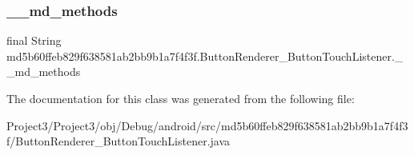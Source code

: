 \subsubsection{\texorpdfstring{\+\_\+\+\_\+md\+\_\+methods}{\_\_md\_methods}}
{\footnotesize\ttfamily final String md5b60ffeb829f638581ab2bb9b1a7f4f3f.\+Button\+Renderer\+\_\+\+Button\+Touch\+Listener.\+\_\+\+\_\+md\+\_\+methods\hspace{0.3cm}{\ttfamily [static]}}



The documentation for this class was generated from the following file\+:\begin{DoxyCompactItemize}
\item 
Project3/\+Project3/obj/\+Debug/android/src/md5b60ffeb829f638581ab2bb9b1a7f4f3f/Button\+Renderer\+\_\+\+Button\+Touch\+Listener.\+java\end{DoxyCompactItemize}
